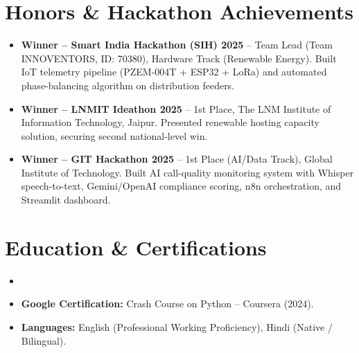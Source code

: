 \documentclass[11pt,a4paper,sans]{moderncv}
\begin{document}
\section{Honors \& Hackathon Achievements}
\vspace{1pt}
\begin{itemize}
\item \textbf{Winner -- Smart India Hackathon (SIH) 2025} -- Team Lead (Team INNOVENTORS, ID: 70380), Hardware Track (Renewable Energy). Built IoT telemetry pipeline (PZEM-004T + ESP32 + LoRa) and automated phase-balancing algorithm on distribution feeders.
\item \textbf{Winner -- LNMIT Ideathon 2025} -- 1st Place, The LNM Institute of Information Technology, Jaipur. Presented renewable hosting capacity solution, securing second national-level win.
\item \textbf{Winner -- GIT Hackathon 2025} -- 1st Place (AI/Data Track), Global Institute of Technology. Built AI call-quality monitoring system with Whisper speech-to-text, Gemini/OpenAI compliance scoring, n8n orchestration, and Streamlit dashboard.
\end{itemize}

\section{Education \& Certifications}
\vspace{1pt}
\begin{itemize}

\item{}

\vspace{2pt}

\item{\textbf{Google Certification:} Crash Course on Python -- Coursera (2024).}

\vspace{2pt}

\item{\textbf{Languages:} English (Professional Working Proficiency), Hindi (Native / Bilingual).}

\end{itemize}
\end{document}
